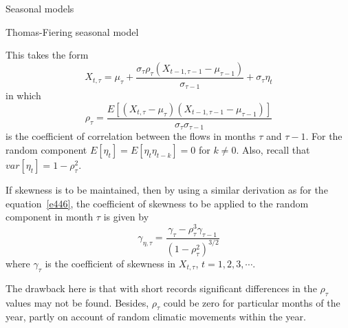 \documentclass[8pt]{beamer}
\renewcommand{\emph}[1]{\textcolor{myorange}{#1}}
\begin{document}
\begin{frame}{Seasonal models}
    \begin{block}{Thomas-Fiering seasonal model}
    \end{block}
This takes the form
\begin{equation}
    X_{t,\tau} = \mu_{\tau} + \frac{\sigma_{\tau} \rho_{\tau} ( X_{t-1, \tau-1} - \mu_{\tau-1})}{\sigma_{\tau-1}} + \sigma_{\tau} \eta_t
        \label{e454}
    \end{equation}
    in which
    \[
    \rho_{\tau} = \frac{E\left[ (X_{t,\tau} - \mu_{\tau})(X_{t-1,\tau-1} - \mu_{\tau-1})\right]}{\sigma_{\tau} \sigma_{\tau-1}}
\]
is the \emph{coefficient of correlation} between the flows in months $\tau$ and $\tau-1$. For the random component $E[\eta_t] = E[\eta_t \eta_{t-k}] = 0$ for $k\neq 0$. Also, recall that $var[\eta_t] = 1-\rho_{\tau}^2$.

If \emph{skewness} is to be maintained, then by using a similar derivation as for the equation~\ref{e446}, the \emph{coefficient of skewness} to be applied to the random component in month $\tau$ is given by
\begin{equation}
    \gamma_{\eta, \tau} = \frac{\gamma_{\tau} - \rho_{\tau}^3 \gamma_{\tau-1}}{(1-\rho_{\tau}^2)^{3/2}}
        \label{e455}
    \end{equation}
    where $\gamma_{\tau}$ is the \emph{coefficient of skewness} in $X_{t,\tau}$, $t=1,2,3,\cdots$.

    The drawback here is that with  short records significant differences in the $\rho_{\tau}$ values may not be found. Besides, $\rho_{\tau}$ could be zero for particular months of the year, partly on account of \emph{random climatic movements} within the year. 

\end{frame}
 
\end{document}
